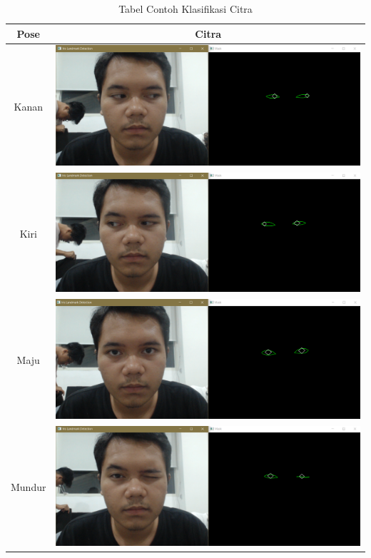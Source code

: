 \begin{table}[H]
\centering
    \caption{Tabel Contoh Klasifikasi Citra}
    \label{tbl:contoh-klasifikasi}
    \begin{tabular}{|c|c|}
        \hline
        Pose              & Citra              \\ \hline
        Kanan                & \includegraphics[scale=0.25]{gambar/bab3/kanan.png}   \\ \hline
        Kiri                & \includegraphics[scale=0.25]{gambar/bab3/kiri.png}   \\ \hline
        Maju               & \includegraphics[scale=0.25]{gambar/bab3/maju.png}  \\ \hline
        Mundur               & \includegraphics[scale=0.25]{gambar/bab3/mundur.png}  \\ \hline

\end{tabular}
\end{table}
